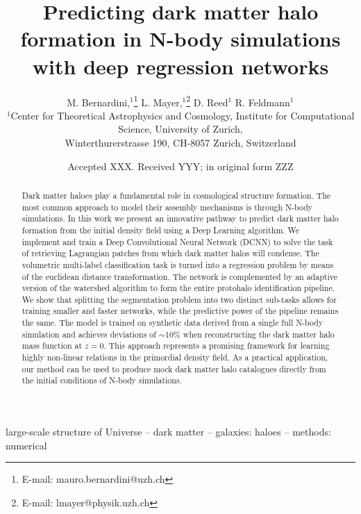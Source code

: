 \documentclass[fleqn,usenatbib]{mnras}
\title[A deep regression network for halo formation]{Predicting dark matter halo formation in N-body simulations with deep regression networks}
\author[M. Bernardini et al.]{
M. Bernardini,$^{1}$\thanks{E-mail: mauro.bernardini@uzh.ch}
L. Mayer,$^{1}$\thanks{E-mail: lmayer@physik.uzh.ch}
D. Reed$^{1}$
R. Feldmann$^{1}$
\\
$^{1}$Center for Theoretical Astrophysics and Cosmology, Institute for Computational Science, University of Zurich,\\
Winterthurerstrasse 190, CH-8057 Zurich, Switzerland\\
}
\date{Accepted XXX. Received YYY; in original form ZZZ}
\begin{document}
\label{firstpage}
\pagerange{\pageref{firstpage}--\pageref{lastpage}}
\maketitle

\begin{abstract}
Dark matter haloes play a fundamental role in cosmological structure formation. 
The most common approach to model their assembly mechanisms is through N-body simulations.
In this work we present an innovative pathway to predict dark matter halo formation from the initial density field using a Deep Learning algorithm. We implement and train a Deep Convolutional Neural Network (DCNN) to solve the task of retrieving Lagrangian patches from which dark matter halos will condense. 
The volumetric multi-label classification task is turned into a regression problem by means of the euclidean distance transformation. The network is complemented by an adaptive version of the watershed algorithm to form the entire protohalo identification pipeline. 
We show that splitting the segmentation problem into two distinct sub-tasks allows for training smaller and faster networks, while the predictive power of the pipeline remains the same. 
The model is trained on synthetic data derived from a single full N-body simulation and achieves deviations of $\sim$10\% when reconstructing the dark matter halo mass function at $z=0$. 
This approach represents a promising framework for learning highly non-linear relations in the primordial density field. As a practical application, our method can be used to produce mock dark matter halo catalogues directly from the initial conditions of N-body simulations.

\end{abstract}

\begin{keywords}
large-scale structure of Universe -- dark matter -- galaxies: haloes -- methods: numerical
\end{keywords}


\end{document}
